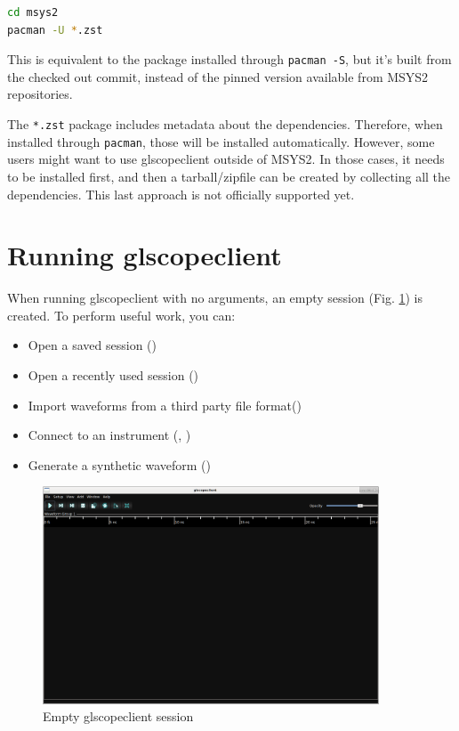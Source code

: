 \begin{enumerate}
\begin{lstlisting}[language=sh, numbers=none]
cd msys2
pacman -U *.zst
\end{lstlisting}

This is equivalent to the package installed through \lstinline{pacman -S}, but it's built from the checked out commit,
instead of the pinned version available from MSYS2 repositories.

The \lstinline{*.zst} package includes metadata about the dependencies.
Therefore, when installed through \lstinline{pacman}, those will be installed automatically.
However, some users might want to use glscopeclient outside of MSYS2.
In those cases, it needs to be installed first, and then a tarball/zipfile can be created by collecting all the dependencies.
This last approach is not officially supported yet.

\end{enumerate}

\section{Running glscopeclient}

When running glscopeclient with no arguments, an empty session (Fig. \ref{empty-window}) is created. To perform useful
work, you can:
\begin{itemize}
\item Open a saved session ()
\item Open a recently used session ()
\item Import waveforms from a third party file format()
\item Connect to an instrument (, )
\item Generate a synthetic waveform ()
\end{itemize}

\begin{figure}[h]
\centering
\includegraphics[width=10cm]{images/empty-window.png}
\caption{Empty glscopeclient session}
\label{empty-window}
\end{figure}

